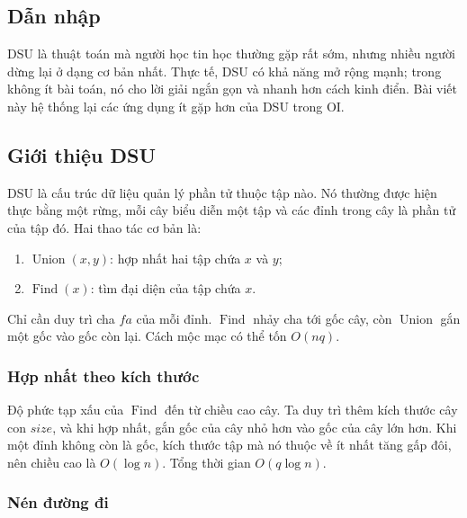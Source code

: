 \documentclass[11pt]{article}
\begin{document}
\renewcommand{\abstractname}{Tóm tắt}
\begin{abstract}
DSU là một thuật toán mộc mạc nhưng hiệu quả, có phạm vi ứng dụng rộng. Bài
viết giới thiệu ba mô hình DSU thường dùng và dùng nhiều ví dụ để minh họa ứng
dụng của ba mô hình này.
\end{abstract}

\subsection{Dẫn nhập}

DSU là thuật toán mà người học tin học thường gặp rất sớm, nhưng nhiều người
dừng lại ở dạng cơ bản nhất. Thực tế, DSU có khả năng mở rộng mạnh; trong
không ít bài toán, nó cho lời giải ngắn gọn và nhanh hơn cách kinh điển. Bài
viết này hệ thống lại các ứng dụng ít gặp hơn của DSU trong OI.

\subsection{Giới thiệu DSU}

DSU là cấu trúc dữ liệu quản lý phần tử thuộc tập nào. Nó thường được hiện thực
bằng một rừng, mỗi cây biểu diễn một tập và các đỉnh trong cây là phần tử của
tập đó. Hai thao tác cơ bản là:
\begin{enumerate}
  \item \(\operatorname{Union}(x,y)\): hợp nhất hai tập chứa \(x\) và \(y\);
  \item \(\operatorname{Find}(x)\): tìm đại diện của tập chứa \(x\).
\end{enumerate}
Chỉ cần duy trì cha \(fa\) của mỗi đỉnh. \(\operatorname{Find}\) nhảy cha tới
gốc cây, còn \(\operatorname{Union}\) gắn một gốc vào gốc còn lại. Cách mộc mạc
có thể tốn \(O(nq)\).

\subsubsection{Hợp nhất theo kích thước}

Độ phức tạp xấu của \(\operatorname{Find}\) đến từ chiều cao cây. Ta duy trì
thêm kích thước cây con \(\mathit{size}\), và khi hợp nhất, gắn gốc của cây
nhỏ hơn vào gốc của cây lớn hơn. Khi một đỉnh không còn là gốc, kích thước tập
mà nó thuộc về ít nhất tăng gấp đôi, nên chiều cao là \(O(\log n)\). Tổng thời
gian \(O(q\log n)\).

\subsubsection{Nén đường đi}
\end{document}
